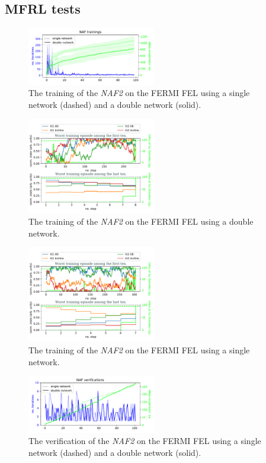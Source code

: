\documentclass[
reprint,
amsmath,amssymb,amsfonts,clevref,
aps,
prstab,
]{revtex4-2}
\begin{document}
	\subsection{MFRL tests}
	\begin{figure}
		\centering
		\includegraphics*[width=0.5\textwidth]{Figures/FERMI_all_experiments_NAF_training_episodes.pdf}
		\caption{The training of the \emph{NAF2} on the FERMI FEL using a single network (dashed) and a double network (solid).}
		\label{fig:NAF_training}
	\end{figure}
	\begin{figure}
		\centering
		\includegraphics*[width=0.5\textwidth]{Figures/Evolution_double.pdf}
		\caption{The training of the \emph{NAF2} on the FERMI FEL using a double network.}
		\label{fig:NAF_evolution_double}
	\end{figure}
	\begin{figure}
	\centering
	\includegraphics*[width=0.5\textwidth]{Figures/Evolution_single.pdf}
	\caption{The training of the \emph{NAF2} on the FERMI FEL using a single network.}
	\label{fig:NAF_evolution_single}
\end{figure}
	\begin{figure}
		\centering
		\includegraphics*[width=0.5\textwidth]{Figures/FERMI_all_experiments_NAF_verification_episodes.pdf}
		\caption{The verification of the \emph{NAF2} on the FERMI FEL using a single network (dashed) and a double network (solid).}
		\label{fig:NAF_verification}
	\end{figure}
	
\end{document}

